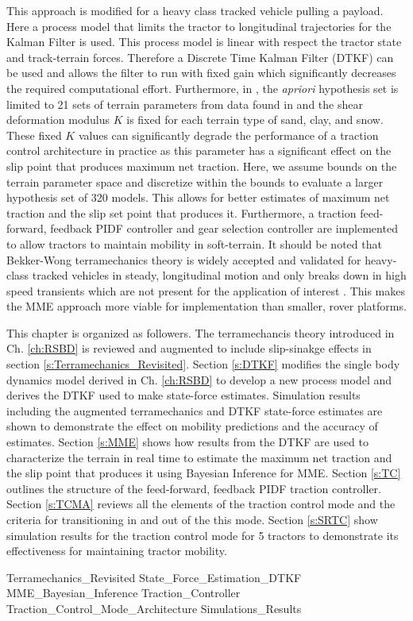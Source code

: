 This approach is modified for a heavy class tracked vehicle pulling a payload. Here a process model that limits the tractor to longitudinal trajectories for the Kalman Filter is used. This process model is linear with respect the tractor state and track-terrain forces. Therefore a Discrete Time Kalman Filter (DTKF) can be used and allows the filter to run with fixed gain which significantly decreases the required computational effort. Furthermore, in \cite{ray2009estimationTerrainForcesParameters}, the \textit{apriori} hypothesis set is limited to 21 sets of terrain parameters from data found in \cite{Wong2008} and the shear deformation modulus $K$ is fixed for each terrain type of sand, clay, and snow. These fixed $K$ values can significantly degrade the performance of a traction control architecture in practice as this parameter has a significant effect on the slip point that produces maximum net traction. Here, we assume bounds on the terrain parameter space and discretize within the bounds to evaluate a larger hypothesis set of 320 models. This allows for better estimates of maximum net traction and the slip set point that produces it. Furthermore, a traction feed-forward, feedback PIDF controller and gear selection controller are implemented to allow tractors to maintain mobility in soft-terrain. It should be noted that Bekker-Wong terramechanics theory is widely accepted and validated for heavy-class tracked vehicles in steady, longitudinal motion and only breaks down in high speed transients which are not present for the application of interest \cite{Wong2008}. This makes the MME approach more viable for implementation than smaller, rover platforms. 

This chapter is organized as followers. The terramechancis theory introduced in Ch. \ref{ch:RSBD} is reviewed and augmented to include slip-sinakge effects in section \ref{s:Terramechanics_Revisited}. Section \ref{s:DTKF} modifies the single body dynamics model derived in Ch. \ref{ch:RSBD} to develop a new process model and derives the DTKF used to make state-force estimates. Simulation results including the augmented terramechanics and DTKF state-force estimates are shown to demonstrate the effect on mobility predictions and the accuracy of estimates. Section \ref{s:MME} shows how results from the DTKF are used to characterize the terrain in real time to estimate the maximum net traction and the slip point that produces it using Bayesian Inference for MME. Section \ref{s:TC} outlines the structure of the feed-forward, feedback PIDF traction controller. Section \ref{s:TCMA} reviews all the elements of the traction control mode and the criteria for transitioning in and out of the this mode. Section \ref{s:SRTC} show simulation results for the traction control mode for 5 tractors to demonstrate its effectiveness for maintaining tractor mobility. 

{Terramechanics_Revisited}
{State_Force_Estimation_DTKF}
{MME_Bayesian_Inference}
{Traction_Controller}
{Traction_Control_Mode_Architecture}
{Simulations_Results}
